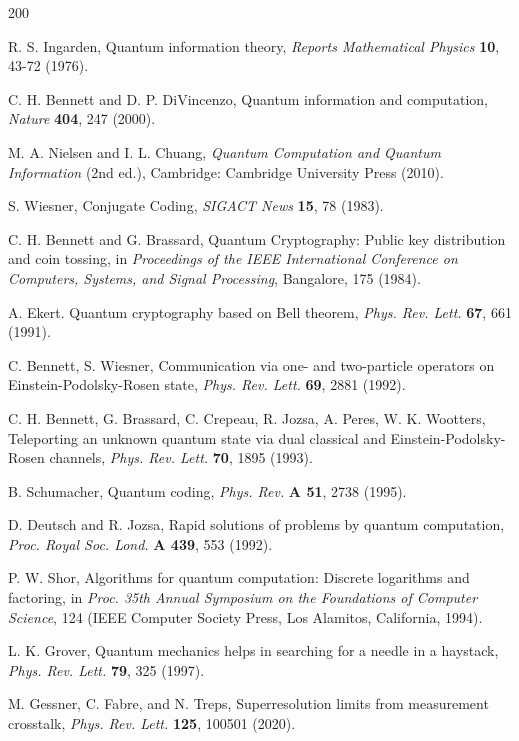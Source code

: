 \documentclass[english,aps,pra,nofootinbib,twocolumn,superscriptaddress]{revtex4-1}
\newcommand{\1}{{\rm 1\hspace{-0.9mm}l}}
\begin{document}
\begin{thebibliography}{200}


 R. S. Ingarden, Quantum information theory,
{\sl Reports Mathematical  Physics} {\bf 10}, 43-72 (1976).

 C. H. Bennett and D. P. DiVincenzo,
 Quantum information and computation,
 {\sl Nature} {\bf 404}, 247 (2000).

 M. A. Nielsen and I. L.  Chuang, {\it Quantum Computation and Quantum Information}  
(2nd ed.), Cambridge: Cambridge University Press (2010).

 S. Wiesner, Conjugate Coding, 
{\sl SIGACT News} {\bf 15}, 78 (1983).

 C. H. Bennett and  G. Brassard, 
  Quantum Cryptography: Public key distribution and coin tossing,
   in {\sl Proceedings of the IEEE International Conference on Computers, Systems, and Signal Processing}, Bangalore, 175 (1984).

 A. Ekert.   Quantum cryptography based on Bell theorem,
{\sl Phys. Rev. Lett.} {\bf 67},  661 (1991).

 C. Bennett, S. Wiesner,
  Communication via one- and two-particle operators on Einstein-Podolsky-Rosen state, 
  {\sl Phys. Rev. Lett.} {\bf  69},  2881 (1992).

 C. H. Bennett, G. Brassard, C.  Crepeau, R. Jozsa, A.  Peres, W. K. Wootters, 
 Teleporting an unknown quantum state via dual classical and Einstein-Podolsky-Rosen channels,
 {\sl Phys. Rev. Lett.} {\bf 70},  1895 (1993).

 B. Schumacher, 
 Quantum coding, {\sl Phys. Rev.} {\bf A 51}, 2738 (1995).

 D. Deutsch and  R. Jozsa,
 Rapid solutions of problems by quantum computation, 
 {\sl Proc. Royal Soc. Lond.} {\bf A 439},  553 (1992).

 P. W. Shor,  
Algorithms for quantum computation: Discrete logarithms and factoring,
 in {\sl Proc. 35th Annual Symposium on the Foundations of Computer Science}, 124 (IEEE Computer Society Press, Los Alamitos, California, 1994).

 L. K. Grover,
  Quantum mechanics helps in searching for a needle in a haystack, 
  {\sl Phys. Rev. Lett.} {\bf 79}, 325 (1997).

 M. Gessner, C. Fabre, and N. Treps,
 Superresolution limits from measurement crosstalk,
 {\sl Phys. Rev. Lett.} {\bf 125}, 100501 (2020).


\end{thebibliography}
\end{document}
